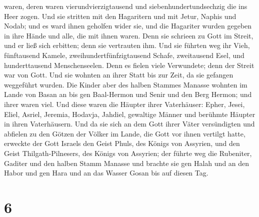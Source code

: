 waren, deren waren vierundvierzigtausend und siebenhundertundsechzig die
ins Heer zogen.  Und sie stritten mit den Hagaritern und
mit Jetur, Naphis und Nodab;  und es ward ihnen geholfen
wider sie, und die Hagariter wurden gegeben in ihre Hände und alle, die
mit ihnen waren. Denn sie schrieen zu Gott im Streit, und er ließ sich
erbitten; denn sie vertrauten ihm.  Und sie führten weg ihr
Vieh, fünftausend Kamele, zweihundertfünfzigtausend Schafe, zweitausend
Esel, und hunderttausend Menschenseelen.  Denn es fielen
viele Verwundete; denn der Streit war von Gott. Und sie wohnten an ihrer
Statt bis zur Zeit, da sie gefangen weggeführt wurden.  Die
Kinder aber des halben Stammes Manasse wohnten im Lande von Basan an bis
gen Baal-Hermon und Senir und den Berg Hermon; und ihrer waren viel.
 Und diese waren die Häupter ihrer Vaterhäuser: Epher,
Jesei, Eliel, Asriel, Jeremia, Hodavja, Jahdiel, gewaltige Männer und
berühmte Häupter in ihren Vaterhäusern.  Und da sie sich an
dem Gott ihrer Väter versündigten und abfielen zu den Götzen der Völker
im Lande, die Gott vor ihnen vertilgt hatte,  erweckte der
Gott Israels den Geist Phuls, des Königs von Assyrien, und den Geist
Thilgath-Pilnesers, des Königs von Assyrien; der führte weg die
Rubeniter, Gaditer und den halben Stamm Manasse und brachte sie gen
Halah und an den Habor und gen Hara und an das Wasser Gosan bis auf
diesen Tag.

\hypertarget{section-5}{%
\section{6}\label{section-5}}

